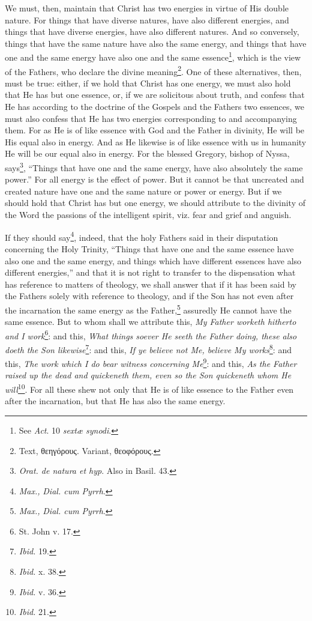 We must, then, maintain that Christ has two energies in virtue of His double nature. For things that have diverse natures, have also different energies, and things that have diverse energies, have also different natures. And so conversely, things that have the same nature have also the same energy, and things that have one and the same energy have also one and the same essence\footnote{See \emph{Act}. 10 \emph{sextæ synodi}.}, which is the view of the Fathers, who declare the divine meaning\footnote{Text, \textgreek{θεηγόρους}. Variant, \textgreek{θεοφόρους}.}. One of these alternatives, then, must be true: either, if we hold that Christ has one energy, we must also hold that He has but one essence, or, if we are solicitous about truth, and confess that He has according to the doctrine of the Gospels and the Fathers two essences, we must also confess that He has two energies corresponding to and accompanying them. For as He is of like essence with God and the Father in divinity, He will be His equal also in energy. And as He likewise is of like essence with us in humanity He will be our equal also in energy. For the blessed Gregory, bishop of Nyssa, says\footnote{\emph{Orat. de natura et hyp}. Also in Basil. 43.}, “Things that have one and the same energy, have also absolutely the same power.” For all energy is the effect of power. But it cannot be that uncreated and created nature have one and the same nature or power or energy. But if we should hold that Christ has but one energy, we should attribute to the divinity of the Word the passions of the intelligent spirit, viz. fear and grief and anguish.

If they should say\footnote{\emph{Max.,} \emph{Dial. cum Pyrrh}.}, indeed, that the holy Fathers said in their disputation concerning the Holy Trinity, “Things that have one and the same essence have also one and the same energy, and things which have different essences have also different energies,” and that it is not right to transfer to the dispensation what has reference to matters of theology, we shall answer that if it has been said by the Fathers solely with reference to theology, and if the Son has not even after the incarnation the same energy as the Father,\footnote{\emph{Max.,} \emph{Dial. cum Pyrrh}.} assuredly He cannot have the same essence. But to whom shall we attribute this, \emph{My Father worketh hitherto and I work}\footnote{St. John v. 17.}: and this, \emph{What things soever He seeth the Father doing, these also doeth the Son likewise}\footnote{\emph{Ibid.} 19.}: and this, \emph{If ye believe not Me, believe My works}\footnote{\emph{Ibid. }x. 38.}: and this, \emph{The work which I do bear witness concerning Me}\footnote{\emph{Ibid. }v. 36.}: and this, \emph{As the Father raised up the dead and quickeneth them, even so the Son quickeneth whom He will}\footnote{\emph{Ibid.} 21.}. For all these shew not only that He is of like essence to the Father even after the incarnation, but that He has also the same energy.

